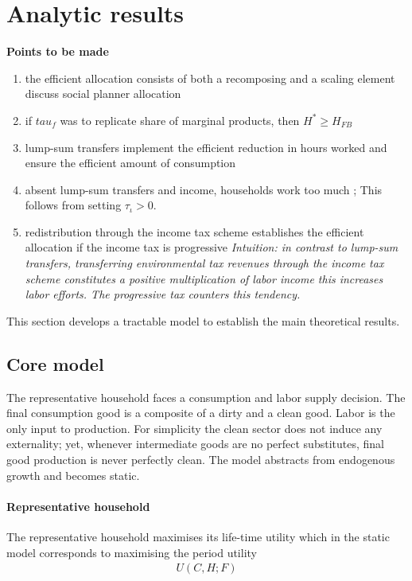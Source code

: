 \section{Analytic results}\label{sec:mod_an}
\textbf{Points to be made}
\begin{enumerate}
\item the efficient allocation consists of both a recomposing and a scaling element \ar discuss social planner allocation \checkmark
\item if $tau_f$ was to replicate share of marginal products, then $H^*\geq H_{FB}$ \checkmark
\item lump-sum transfers implement the efficient reduction in hours worked and ensure the efficient amount of consumption \checkmark
\item absent lump-sum transfers and income, households work too much  \checkmark; This follows from setting $\tau_\iota>0$.
\item redistribution through the income tax scheme establishes the efficient allocation if the income tax is progressive \textit{Intuition: in contrast to lump-sum transfers, transferring environmental tax revenues through the income tax scheme constitutes a positive multiplication of labor income \ar this increases labor efforts. The progressive tax counters this tendency.} \checkmark
\end{enumerate}

This section develops a tractable model to establish the main theoretical results. %

\subsection{Core model}
The representative household faces a consumption and labor supply decision. The final consumption good is a composite of a dirty and a clean good. Labor is the only input to production. For simplicity the clean sector does not induce any externality; yet, whenever intermediate goods are no perfect substitutes, final good production is never perfectly clean. The model abstracts from endogenous growth and becomes static. 

\paragraph{Representative household}
The representative household maximises its life-time utility which in the static model corresponds to maximising the period utility
\begin{align}
U(C,H; F)
\end{align} 

